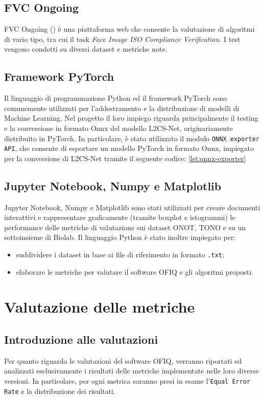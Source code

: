 \documentclass[12pt,a4paper,openright,twoside]{book}
\begin{document}
\section{FVC Ongoing}
FVC Ongoing (\cite{fvcongoing}) è una piattaforma web che consente la valutazione di algoritmi di vario tipo, tra cui il task \textit{Face Image ISO Compliance Verification}.
I test vengono condotti su diversi dataset e metriche note.

\section{Framework PyTorch}
Il linguaggio di programmazione Python ed il framework PyTorch sono comunemente utilizzati per l'addestramento e la distribuzione di modelli di Machine Learning. 
Nel progetto il loro impiego riguarda principalmente il testing e la conversione in formato Onnx del modello L2CS-Net, originariamente distribuito in PyTorch.
In particolare, è stato utilizzato il modulo \texttt{ONNX exporter API}, che consente di esportare un modello PyTorch in formato Onnx, impiegato per la conversione di L2CS-Net tramite il seguente codice: \cref{lst:onnx-exporter}



\section{Jupyter Notebook, Numpy e Matplotlib}
Jupyter Notebook, Numpy e Matplotlib sono stati utilizzati per creare documenti interattivi e rappresentare graficamente (tramite boxplot e istogrammi) le performance delle metriche di valutazione sui dataset ONOT, TONO e su un sottoinsieme di Biolab.
Il linguaggio Python è stato inoltre impiegato per:
\begin{itemize}
    \item suddividere i dataset in base ai file di riferimento in formato \texttt{.txt};
    \item elaborare le metriche per valutare il software OFIQ e gli algoritmi proposti.
\end{itemize}

\chapter{Valutazione delle metriche}

\section{Introduzione alle valutazioni}
Per quanto riguarda le valutazioni del software OFIQ, verranno riportati ed analizzati esclusivamente i risultati delle metriche implementate nelle loro diverse versioni. 
In particolare, per ogni metrica saranno presi in esame l'\texttt{Equal Error Rate} e la distribuzione dei risultati.
\end{document}
